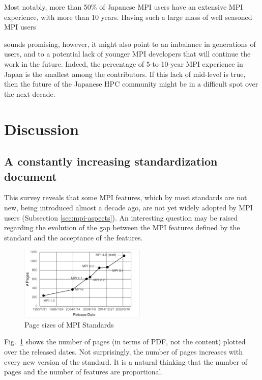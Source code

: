 \documentclass[preprint,5p,times]{elsarticle}
\newcommand{\revision}[2]{{\color{blue}#2}}
\def\countries{contributors\xspace{}}%
\begin{document}
Most notably, more than 50\% of Japanese MPI users have an extensive MPI
experience, with more than 10 years. Having such a large mass of well seasoned
MPI users {\revision{sound}{sounds} promising, however, it might also point to an imbalance in
generations of users, and to a potential lack of younger MPI developers that
will continue the work in the future.
Indeed, the percentage of 5-to-10-year MPI experience in Japan is the smallest
among the \countries. If this lack of mid-level is true, then the
future of \revision{}{the}
Japanese HPC community might be in a difficult spot over the next decade.

\section{Discussion}

\subsection{A constantly increasing standardization document}

This survey reveals that some MPI features, which by most standards are not new,
being introduced almost a decade ago, are not yet widely adopted by MPI users
(Subsection \ref{sec:mpi-aspects}). An interesting question may be raised
regarding the evolution of the gap between the MPI features defined by the
standard and the acceptance of the features.

\begin{figure}[tb]
\begin{center}
\includegraphics[width=6cm]{Figs/MPI-Standards.pdf}
\vspace{-1.5mm}
\caption{Page sizes of MPI Standards}
\label{fig:mpi-standards}
\vspace{-3mm}%
\end{center}
\end{figure}

Fig.~\ref{fig:mpi-standards} shows the number of pages (in terms of PDF, not the
content) plotted over the released dates. Not surprisingly, the number of pages
increases with every new version of the standard. It is a natural thinking that
the number of pages and the number of features are proportional.

}
\end{document}
